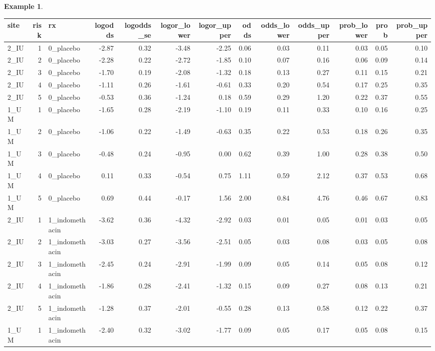 \documentclass[
  openany]{book}
\theoremstyle{definition}
\theoremstyle{definition}
\newtheorem{example}{Example}[chapter]
\theoremstyle{definition}
\theoremstyle{definition}
\theoremstyle{remark}
\begin{document}
\begin{example}
\begin{table}
\centering
\begin{tabular}{l|r|l|r|r|r|r|r|r|r|r|r|r}
\hline
site & risk & rx & logodds & logodds\_se & logor\_lower & logor\_upper & odds & odds\_lower & odds\_upper & prob\_lower & prob & prob\_upper\\
\hline
2\_IU & 1 & 0\_placebo & -2.87 & 0.32 & -3.48 & -2.25 & 0.06 & 0.03 & 0.11 & 0.03 & 0.05 & 0.10\\
\hline
2\_IU & 2 & 0\_placebo & -2.28 & 0.22 & -2.72 & -1.85 & 0.10 & 0.07 & 0.16 & 0.06 & 0.09 & 0.14\\
\hline
2\_IU & 3 & 0\_placebo & -1.70 & 0.19 & -2.08 & -1.32 & 0.18 & 0.13 & 0.27 & 0.11 & 0.15 & 0.21\\
\hline
2\_IU & 4 & 0\_placebo & -1.11 & 0.26 & -1.61 & -0.61 & 0.33 & 0.20 & 0.54 & 0.17 & 0.25 & 0.35\\
\hline
2\_IU & 5 & 0\_placebo & -0.53 & 0.36 & -1.24 & 0.18 & 0.59 & 0.29 & 1.20 & 0.22 & 0.37 & 0.55\\
\hline
1\_UM & 1 & 0\_placebo & -1.65 & 0.28 & -2.19 & -1.10 & 0.19 & 0.11 & 0.33 & 0.10 & 0.16 & 0.25\\
\hline
1\_UM & 2 & 0\_placebo & -1.06 & 0.22 & -1.49 & -0.63 & 0.35 & 0.22 & 0.53 & 0.18 & 0.26 & 0.35\\
\hline
1\_UM & 3 & 0\_placebo & -0.48 & 0.24 & -0.95 & 0.00 & 0.62 & 0.39 & 1.00 & 0.28 & 0.38 & 0.50\\
\hline
1\_UM & 4 & 0\_placebo & 0.11 & 0.33 & -0.54 & 0.75 & 1.11 & 0.59 & 2.12 & 0.37 & 0.53 & 0.68\\
\hline
1\_UM & 5 & 0\_placebo & 0.69 & 0.44 & -0.17 & 1.56 & 2.00 & 0.84 & 4.76 & 0.46 & 0.67 & 0.83\\
\hline
2\_IU & 1 & 1\_indomethacin & -3.62 & 0.36 & -4.32 & -2.92 & 0.03 & 0.01 & 0.05 & 0.01 & 0.03 & 0.05\\
\hline
2\_IU & 2 & 1\_indomethacin & -3.03 & 0.27 & -3.56 & -2.51 & 0.05 & 0.03 & 0.08 & 0.03 & 0.05 & 0.08\\
\hline
2\_IU & 3 & 1\_indomethacin & -2.45 & 0.24 & -2.91 & -1.99 & 0.09 & 0.05 & 0.14 & 0.05 & 0.08 & 0.12\\
\hline
2\_IU & 4 & 1\_indomethacin & -1.86 & 0.28 & -2.41 & -1.32 & 0.15 & 0.09 & 0.27 & 0.08 & 0.13 & 0.21\\
\hline
2\_IU & 5 & 1\_indomethacin & -1.28 & 0.37 & -2.01 & -0.55 & 0.28 & 0.13 & 0.58 & 0.12 & 0.22 & 0.37\\
\hline
1\_UM & 1 & 1\_indomethacin & -2.40 & 0.32 & -3.02 & -1.77 & 0.09 & 0.05 & 0.17 & 0.05 & 0.08 & 0.15\\

\end{tabular}
\end{table}
\end{example}
\end{document}
